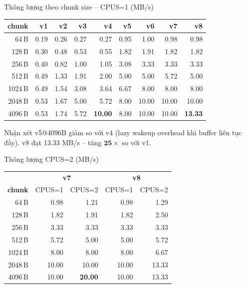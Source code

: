 \documentclass[aspectratio=169]{beamer}
\begin{document}
\begin{frame}{Thông lượng theo chunk size -- CPUS=1 (MB/s)}
    \centering
    \scriptsize
    \renewcommand{\arraystretch}{1.15}
    \begin{tabular}{r|rrrrrrrr}
        \toprule
        \textbf{chunk} & \textbf{v1} & \textbf{v2} & \textbf{v3} & \textbf{v4} & \textbf{v5} & \textbf{v6} & \textbf{v7} & \textbf{v8} \\
        \midrule
        64\,B   & 0.19 & 0.26 & 0.27 & 0.27 & 0.95 & 1.00 & 0.98 & 0.98 \\
        128\,B  & 0.30 & 0.48 & 0.53 & 0.55 & 1.82 & 1.91 & 1.82 & 1.82 \\
        256\,B  & 0.40 & 0.82 & 1.00 & 1.05 & 3.08 & 3.33 & 3.33 & 3.33 \\
        512\,B  & 0.49 & 1.33 & 1.91 & 2.00 & 5.00 & 5.00 & 5.72 & 5.00 \\
        1024\,B & 0.49 & 1.54 & 3.08 & 3.64 & 6.67 & 8.00 & 8.00 & 8.00 \\
        2048\,B & 0.53 & 1.67 & 5.00 & 5.72 & 8.00 & 10.00 & 10.00 & 10.00 \\
        4096\,B & 0.53 & 1.74 & 5.72 & \textbf{10.00} & 8.00 & 10.00 & 10.00 & \textbf{13.33} \\
        \bottomrule
    \end{tabular}
    \renewcommand{\arraystretch}{1}
    \vspace{0.4em}

    \begin{alertblock}{\scriptsize Nhận xét}
        \scriptsize v5@4096B giảm so với v4 (lazy wakeup overhead khi buffer liên tục đầy).
        v8 đạt 13.33 MB/s -- tăng $\mathbf{25\times}$ so với v1.
    \end{alertblock}
\end{frame}

\begin{frame}{Thông lượng CPUS=2 (MB/s)}
    \centering
    \renewcommand{\arraystretch}{1.2}
    \begin{tabular}{r|rr|rr}
        \toprule
        & \multicolumn{2}{c|}{\textbf{v7}} & \multicolumn{2}{c}{\textbf{v8}} \\
        \textbf{chunk} & CPUS=1 & CPUS=2 & CPUS=1 & CPUS=2 \\
        \midrule
        64\,B   & 0.98 & 1.21 & 0.98 & 1.29 \\
        128\,B  & 1.82 & 1.91 & 1.82 & 2.50 \\
        256\,B  & 3.33 & 3.33 & 3.33 & 3.33 \\
        512\,B  & 5.72 & 5.00 & 5.00 & 5.72 \\
        1024\,B & 8.00 & 8.00 & 8.00 & 6.67 \\
        2048\,B & 10.00 & 10.00 & 10.00 & 13.33 \\
        4096\,B & 10.00 & \textbf{20.00} & 10.00 & 13.33 \\
        \bottomrule
    \end{tabular}
    \renewcommand{\arraystretch}{1}
\end{frame}
\end{document}
